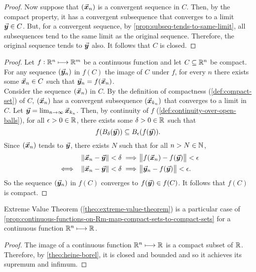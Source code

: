 \documentclass[../MathsNotesBase.tex]{subfiles}
\begin{document}
{\begin{proof}
			Now suppose that $(\vec{\bm{x}}_n)$ is a convergent sequence in $C$. Then, by the compact property, it has a convergent subsequence that converges to a limit ${ \vec{\bm{y}} \in C }$. But, for a convergent sequence, by \autoref{prop:subseq-tends-to-same-limit}, all subsequences tend to the same limit as the original sequence. Therefore, the original sequence tends to $\vec{\bm{y}}$ also. It follows that $C$ is closed.
		\end{proof}
		
		\bigskip
		\begin{proof}
			Let ${ f: \mathbb{R}^{n} \longmapsto \mathbb{R}^{m} }$ be a continuous function and let ${ C \subseteq \mathbb{R}^{n} }$ be compact. For any sequence $(\vec{\bm{y}}_n)$ in $f(C)$ the image of $C$ under $f$, for every $n$ there exists some ${ \vec{\bm{x}}_n \in C }$ such that ${ \vec{\bm{y}}_n = f(\vec{\bm{x}}_n) }$.\\
			
			Consider the sequence $(\vec{\bm{x}}_n)$ in $C$. By the definition of compactness (\ref{def:compact-set}) of $C$, $(\vec{\bm{x}}_n)$ has a convergent subsequence $(\vec{\bm{x}}_{k_n})$ that converges to a limit in $C$. Let ${ \vec{\bm{y}} = \lim_{n \to \infty} \vec{\bm{x}}_{k_n} }$. Then, by continuity of $f$ (\ref{def:continuity-over-open-balls}), for all ${ \epsilon > 0 \in \mathbb{R}^{} }$, there exists some ${ \delta > 0 \in \mathbb{R}^{} }$ such that
			\[ f(B_\delta(\vec{\bm{y}})) \subseteq B_\epsilon(f(\vec{\bm{y}})). \]
			Since $(\vec{\bm{x}}_n)$ tends to $\vec{\bm{y}}$, there exists $N$ such that for all ${ n > N \in \mathbb{N}^{} }$,
			\[\begin{aligned}
				&& \norm{\vec{\bm{x}}_n - \vec{\bm{y}}} < \delta &\implies \norm{f(\vec{\bm{x}}_n) - f(\vec{\bm{y}})} < \epsilon  \\
				&\iff & \norm{\vec{\bm{x}}_n - \vec{\bm{y}}} < \delta &\implies \norm{\vec{\bm{y}}_n - f(\vec{\bm{y}})} < \epsilon.
			\end{aligned}\]
			So the sequence $(\vec{\bm{y}}_n)$ in $f(C)$ converges to ${ f(\vec{\bm{y}}) \in f(C) }$. It follows that $f(C)$ is compact.
		\end{proof}
		\begin{corollary}
			Extreme Value Theorem (\autoref{theo:extreme-value-theorem}) is a particular case of \autoref{prop:continuous-functions-on-Rm-map-compact-sets-to-compact-sets} for a continuous function ${ \mathbb{R}^{n} \longmapsto \mathbb{R}^{} }$.
		\end{corollary}
		\begin{proof}
			The image of a continuous function ${ \mathbb{R}^{n} \longmapsto \mathbb{R}^{} }$ is a compact subset of $\mathbb{R}^{}$. Therefore, by \autoref{theo:heine-borel}, it is closed and bounded and so it achieves its supremum and infimum.
		\end{proof}

	}
  
\end{document}
